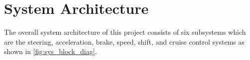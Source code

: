 \documentclass[letterpaper,12pt]{article}   %
\begin{document}
\section{System Architecture}
The overall system architecture of this project consists of six subsystems which are the steering, acceleration, brake, speed, shift, and cruise control systems as shown in \autoref{fig:sys_block_diag}.




\end{document}
